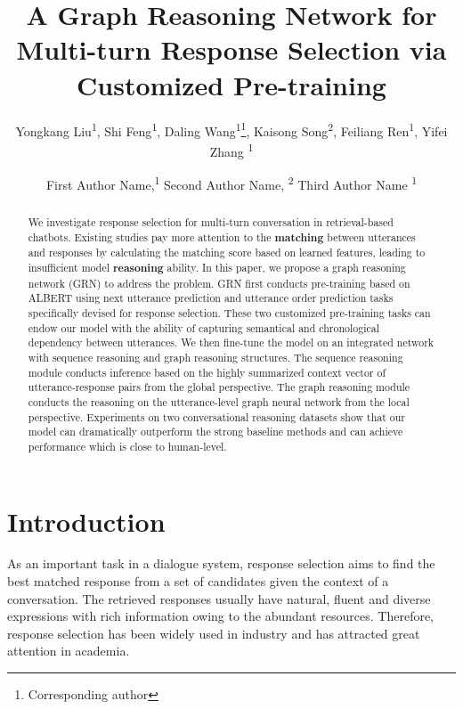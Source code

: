 \documentclass[letterpaper]{article} %
\title{A Graph Reasoning Network for Multi-turn Response Selection via Customized Pre-training}
\author {
        Yongkang Liu\textsuperscript{\rm 1},
        Shi Feng\textsuperscript{\rm 1},
        Daling Wang\textsuperscript{\rm 1}\thanks{Corresponding author},
        Kaisong Song\textsuperscript{\rm 2},
        Feiliang Ren\textsuperscript{\rm 1},
        Yifei Zhang \textsuperscript{\rm 1}\\
}
\author {

        First Author Name,\textsuperscript{\rm 1}
        Second Author Name, \textsuperscript{\rm 2}
        Third Author Name \textsuperscript{\rm 1} \\
}
\begin{document}
\maketitle

\begin{abstract}
We investigate response selection for multi-turn conversation in retrieval-based chatbots. Existing studies pay more attention to the \textbf{matching} between utterances and responses by calculating the matching score based on learned features, leading to insufficient model \textbf{reasoning} ability. In this paper, we propose a graph reasoning network (GRN) to address the problem. GRN first conducts pre-training based on ALBERT using next utterance prediction and utterance order prediction tasks specifically devised for response selection. These two customized pre-training tasks can endow our model with the ability of capturing semantical and chronological dependency between utterances. We then fine-tune the model on an integrated network with sequence reasoning and graph reasoning structures. The sequence reasoning module conducts inference based on the highly summarized context vector of utterance-response pairs from the global perspective. The graph reasoning module conducts the reasoning on the utterance-level graph neural network from the local perspective. Experiments on two conversational reasoning datasets show that our model can dramatically outperform the strong baseline methods and can achieve performance which is close to human-level.
\end{abstract}

\section{Introduction}
As an important task in a dialogue system, response selection aims to find the best matched response from a set of candidates given the context of a conversation. The retrieved responses usually have natural, fluent and diverse expressions with rich information owing to the abundant resources. Therefore, response selection has been widely used in industry and has attracted great attention in academia.
\end{document}
